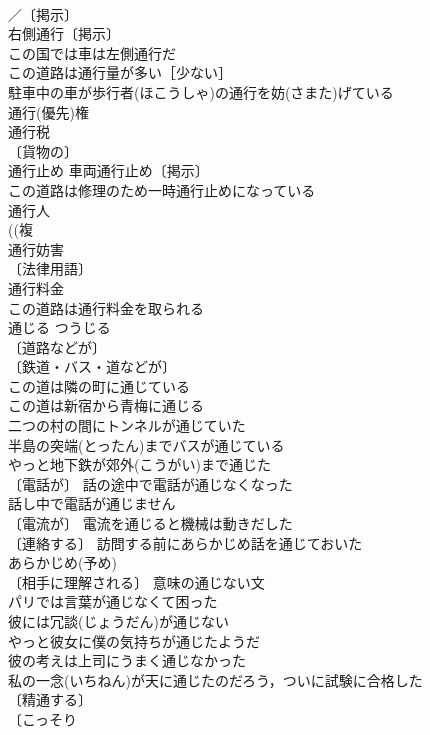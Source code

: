 \documentclass[8pt]{extreport}
\begin{document}
\begin{CJK}{UTF8}{min}
\\	／〔掲示〕
\\	右側通行〔掲示〕 
\\	この国では車は左側通行だ 
\\	この道路は通行量が多い［少ない］ 
\\	駐車中の車が歩行者(ほこうしゃ)の通行を妨(さまた)げている 
\\	通行(優先)権 
\\	通行税 
\\	〔貨物の〕
\\	通行止め 車両通行止め〔掲示〕 
\\	この道路は修理のため一時通行止めになっている 
\\	通行人 
\\	((複
\\	通行妨害 
\\	〔法律用語〕
\\	通行料金 
\\	この道路は通行料金を取られる 
\\	通じる	つうじる	
\\	〔道路などが〕
\\	〔鉄道・バス・道などが〕
\\	この道は隣の町に通じている 
\\	この道は新宿から青梅に通じる 
\\	二つの村の間にトンネルが通じていた 
\\	半島の突端(とったん)までバスが通じている 
\\	やっと地下鉄が郊外(こうがい)まで通じた 
\\	〔電話が〕 話の途中で電話が通じなくなった 
\\	話し中で電話が通じません 
\\	〔電流が〕 電流を通じると機械は動きだした 
\\	〔連絡する〕 訪問する前にあらかじめ話を通じておいた 
\\	あらかじめ(予め)　
\\	〔相手に理解される〕 意味の通じない文 
\\	パリでは言葉が通じなくて困った 
\\	彼には冗談(じょうだん)が通じない 
\\	やっと彼女に僕の気持ちが通じたようだ 
\\	彼の考えは上司にうまく通じなかった 
\\	私の一念(いちねん)が天に通じたのだろう，ついに試験に合格した 
\\	〔精通する〕
\\	〔こっそり

\end{CJK}
\end{document}
